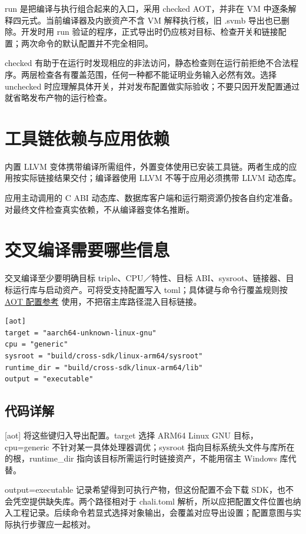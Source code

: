 run 是把编译与执行组合起来的入口，采用 checked AOT，并非在 VM 中逐条解释四元式。当前编译器及内嵌资产不含 VM 解释执行核，旧 .svmb 导出也已删除。开发时用 run 验证的程序，正式导出时仍应核对目标、检查开关和链接配置；两次命令的默认配置并不完全相同。

checked 有助于在运行时发现相应的非法访问，静态检查则在运行前拒绝不合法程序。两层检查各有覆盖范围，任何一种都不能证明业务输入必然有效。选择 unchecked 时应理解具体开关，并对发布配置做实际验收；不要只因开发配置通过就省略发布产物的运行检查。

\section{工具链依赖与应用依赖}

内置 LLVM 变体携带编译所需组件，外置变体使用已安装工具链。两者生成的应用按实际链接结果交付；编译器使用 LLVM 不等于应用必须携带 LLVM 动态库。

应用主动调用的 C ABI 动态库、数据库客户端和运行期资源仍按各自约定准备。对最终文件检查真实依赖，不从编译器变体名推断。

\section{交叉编译需要哪些信息}

交叉编译至少要明确目标 triple、CPU／特性、目标 ABI、sysroot、链接器、目标运行库与启动资产。可将受支持配置写入 toml；具体键与命令行覆盖规则按 \href{https://github.com/rabbitc999/ChaLi/blob/master/doc/38-aot.md}{AOT 配置参考} 使用，不把宿主库路径混入目标链接。

\par
\medskip
\begin{lstlisting}[style=cfg]
[aot]
target = "aarch64-unknown-linux-gnu"
cpu = "generic"
sysroot = "build/cross-sdk/linux-arm64/sysroot"
runtime_dir = "build/cross-sdk/linux-arm64/lib"
output = "executable"
\end{lstlisting}
\par
\medskip

\subsection*{代码详解}

[aot] 将这些键归入导出配置。target 选择 ARM64 Linux GNU 目标，cpu=generic 不针对某一具体处理器调优；sysroot 指向目标系统头文件与库所在的根，runtime\_dir 指向该目标所需运行时链接资产，不能用宿主 Windows 库代替。

output=executable 记录希望得到可执行产物，但这份配置不会下载 SDK，也不会凭空提供缺失库。两个路径相对于 chali.toml 解析，所以应把配置文件位置也纳入工程记录。后续命令若显式选择对象输出，会覆盖对应导出设置；配置意图与实际执行步骤应一起核对。

